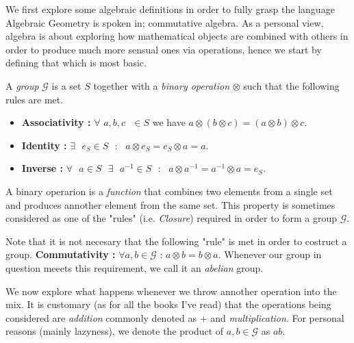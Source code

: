 We first explore some algebraic definitions in order to fully grasp the language Algebraic Geometry is spoken in; commutative algebra.
As a personal view, algebra is about exploring how mathematical objects are combined with others in order to produce much more sensual ones via operations, hence we start by defining that which is most basic.

\vspace{0.3cm}

\begin{definition}
    A \textit{group} $\mathcal{G}$ is a set $S$ together with a \textit{binary operation} $\otimes$ such that the following rules are met.
    \begin{itemize}
        \item \textbf{Associativity : } $\forall$ $a,b,c \text{ } \in S$ we have $a \otimes (b \otimes c) = (a \otimes b) \otimes c$.
        \item \textbf{Identity :} $\exists \text{ } e_S \in S \text{ } : \text{ } a \otimes e_S = e_S \otimes a = a$.
        \item \textbf{Inverse : } $\forall \text{ } a \in S \text{ } \exists \text{ } a^{-1} \in S \text{ } : \text{ } a \otimes a^{-1} = a^{-1} \otimes a = e_S$.
    \end{itemize} 
\end{definition}

\vspace{0.3cm}

A binary operarion is a \textit{function} that combines two elements from a single set and produces annother element from the same set. This property is sometimes considered as one of the "rules" (i.e. \textit{Closure}) required
in order to form a group $\mathcal{G}$.

\vspace{0.3cm}

\begin{remark}
    Note that it is not necesary that the following "rule" is met in order to costruct a group. \textbf{Commutativity :} $\forall a,b \in \mathcal{G} \text{ : } a \otimes b = b \otimes a$. Whenever our group in question
    meeets this requirement, we call it an \textit{abelian} group.
\end{remark}

\vspace{0.3cm}

We now explore what happens whenever we throw annother operation into the mix. It is customary (as for all the books I've read) that the operations being considered are \textit{addition} commonly denoted as
$+$ and \textit{multiplication}. For personal reasons (mainly lazyness), we denote the product of $a,b \in \mathcal{G}$ as $ab$.

